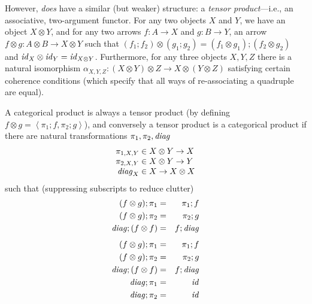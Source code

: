 \begin{defn}[$R$-similarity]
\begin{theorem}
\begin{lemma}
\begin{theorem}[No products]
However, \LENS{} \emph{does} have a similar (but weaker) structure: a
\emph{tensor product}---i.e., an associative, two-argument functor.
For
any two objects $X$ and $Y$, we have an object $X\otimes Y$, and for any two
arrows $f : A\rightarrow X$ and $g : B \rightarrow Y$, an arrow
$f\otimes g : A \otimes B \rightarrow X \otimes Y$ such that
$(f_1;f_2)\otimes (g_1;g_2) = (f_1 \otimes g_1) ; (f_2 \otimes g_2)$ and
$\mathit{id}_X \otimes \mathit{id}_Y = \mathit{id}_{X \otimes Y}$. Furthermore, for any three objects
$X,Y,Z$ there is a natural isomorphism $\alpha_{X,Y,Z} : (X \otimes Y)
\otimes Z \to X \otimes (Y \otimes Z)$ satisfying certain coherence
conditions (which specify that all ways of re-associating
a quadruple are equal).

A categorical product is always a tensor product (by defining $f \otimes g =
\left<\pi_1 ; f,\pi_2 ; g\right>$), and conversely a tensor product is a
categorical product if there are natural transformations $\pi_1,\pi_2,\mathit{diag}$
\[
\begin{array}{r@{\;\in\;}l}
\pi_{1,X,Y} & X \otimes Y \to X \\
\pi_{2,X,Y} & X \otimes Y \to Y \\
\diag_{X}   & X \to X \otimes X
\end{array}
\]
such that (suppressing subscripts to reduce clutter)
\iffull
\setcounter{equation}{0}
\begin{eqnarray}
(f \otimes g) ; \pi_1 &=& \pi_1 ; f \label{beta_1}\\
(f \otimes g) ; \pi_2 &=& \pi_2 ; g \label{beta_2}\\
\diag ; (f \otimes f) &=& f ; \diag \label{beta_3}
\end{eqnarray}
\else
\begin{eqnarray}
(f \otimes g) ; \pi_1 &=& \pi_1 ; f \label{beta_1}\\
(f \otimes g) ; \pi_2 &=& \pi_2 ; g \label{beta_2}\\
\diag ; (f \otimes f) &=& f ; \diag \label{beta_3}\\
\diag ; \pi_1 &=& \id \\
\diag ; \pi_2 &=& \id \\

\end{eqnarray}
\end{theorem}
\end{lemma}
\end{theorem}
\end{defn}
